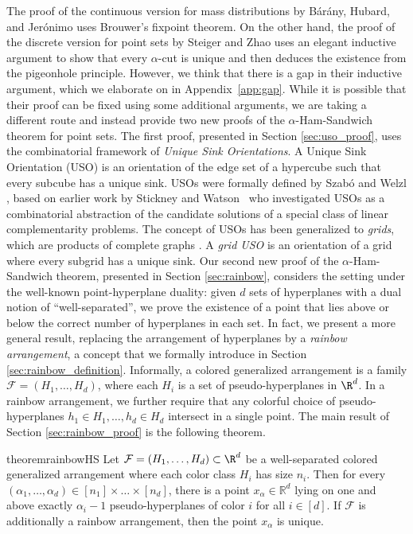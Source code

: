 %
The proof of the continuous version for mass distributions by B\'{a}r\'{a}ny, Hubard, and Jer\'{o}nimo \cite{baranySlicingConvexSets2008} uses Brouwer's fixpoint theorem. On the other hand, the proof of the discrete version for point sets by Steiger and Zhao \cite{steigerGeneralizedHamSandwichCuts2010} uses an elegant inductive argument to show that every $\alpha$-cut is unique and then deduces the existence from the pigeonhole principle. However, we think that there is a gap in their inductive argument, which we elaborate on in Appendix~\ref{app:gap}. While it is possible that their proof can be fixed using some additional arguments, we are taking a different route and instead provide two new proofs of the $\alpha$-Ham-Sandwich theorem for point sets.
%
The first proof, presented in Section \ref{sec:uso_proof}, uses the combinatorial framework of \emph{Unique Sink Orientations}.
A Unique Sink Orientation (USO) is an orientation of the edge set of a hypercube such that every subcube has a unique sink. USOs were formally defined by Szab{\'o} and Welzl \cite{szabo2001usos}, based on earlier work by Stickney and Watson~\cite{stickney1978digraph} who investigated USOs as a combinatorial abstraction of the candidate solutions of a special class of linear complementarity problems.
The concept of USOs has been generalized to \emph{grids}, which are products of complete graphs \cite{gaertner2008grids}. A \emph{grid USO} is an orientation of a grid where every subgrid has a unique sink.
%
%
Our second new proof of the $\alpha$-Ham-Sandwich theorem, presented in Section \ref{sec:rainbow}, considers the setting under the well-known point-hyperplane duality: given $d$ sets of hyperplanes with a dual notion of ``well-separated'', we prove the existence of a point that lies above or below the correct number of hyperplanes in each set. In fact, we present a more general result, replacing the arrangement of hyperplanes by a \emph{rainbow arrangement}, a concept that we formally introduce in Section \ref{sec:rainbow_definition}. Informally, a colored generalized arrangement is a family $\mathcal{F}=(H_1, \ldots, H_d)$, where each $H_i$ is a set of pseudo-hyperplanes in $\R^d$. In a rainbow arrangement, we further require that any colorful choice of pseudo-hyperplanes $h_1\in H_1,\ldots,h_d\in H_d$ intersect in a single point. The main result of Section \ref{sec:rainbow_proof} is the following theorem.
%
\begin{restatable}{theorem}{rainbowHS}\label{thm:rainbowHS}
Let $\mathcal{F}=(H_1, \ldots,H_d)\subset\R^d$ be a well-separated colored generalized arrangement where each color class $H_i$ has size $n_i$. Then for every $(\alpha_1, \dots, \alpha_d) \in [n_1] \times \dots \times [n_d]$, there is a point $x_{\alpha} \in \mathbb{R}^d$ lying on one and above exactly $\alpha_i - 1$ pseudo-hyperplanes of color $i$ for all $i \in [d]$.
If $\mathcal{F}$ is additionally a rainbow arrangement, then the point $x_\alpha$ is unique.
\end{restatable}
